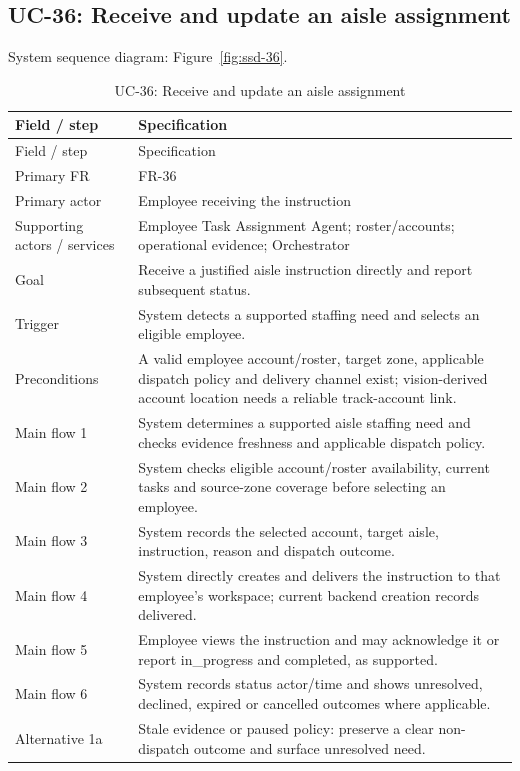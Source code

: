 \subsection*{UC-36: Receive and update an aisle assignment}
\label{uc:36}
System sequence diagram: Figure~\ref{fig:ssd-36}.

\begin{longtable}{P{0.23\textwidth}P{0.67\textwidth}}
\caption{UC-36: Receive and update an aisle assignment}\\
\toprule
Field / step & Specification\\
\midrule
\endfirsthead
\toprule
Field / step & Specification\\
\midrule
\endhead
Primary FR & FR-36\\
Primary actor & Employee receiving the instruction\\
Supporting actors / services & Employee Task Assignment Agent; roster/accounts; operational evidence; Orchestrator\\
Goal & Receive a justified aisle instruction directly and report subsequent status.\\
Trigger & System detects a supported staffing need and selects an eligible employee.\\
Preconditions & A valid employee account/roster, target zone, applicable dispatch policy and delivery channel exist; vision-derived account location needs a reliable track-account link.\\
Main flow 1 & System determines a supported aisle staffing need and checks evidence freshness and applicable dispatch policy.\\
Main flow 2 & System checks eligible account/roster availability, current tasks and source-zone coverage before selecting an employee.\\
Main flow 3 & System records the selected account, target aisle, instruction, reason and dispatch outcome.\\
Main flow 4 & System directly creates and delivers the instruction to that employee's workspace; current backend creation records delivered.\\
Main flow 5 & Employee views the instruction and may acknowledge it or report in\_progress and completed, as supported.\\
Main flow 6 & System records status actor/time and shows unresolved, declined, expired or cancelled outcomes where applicable.\\
Alternative 1a & Stale evidence or paused policy: preserve a clear non-dispatch outcome and surface unresolved need.\\

\end{longtable}
